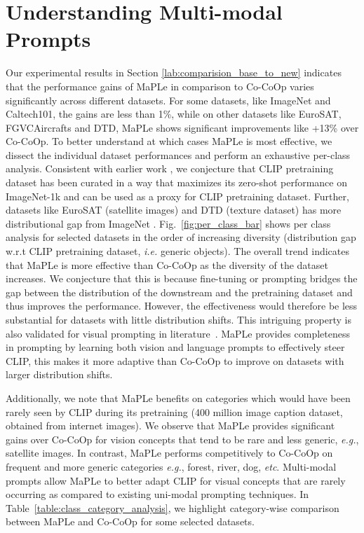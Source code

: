 \documentclass[10pt,twocolumn,letterpaper]{article}
\def\ie{\emph{i.e.}\xspace}
\def\eg{\emph{e.g.}\xspace}
\begin{document}
\section{Understanding Multi-modal Prompts}
\label{appendix:further_analysis}
\noindent Our experimental results in Section \ref{lab:comparision_base_to_new} indicates that the performance gains of MaPLe in comparison to Co-CoOp varies significantly across different datasets. For some datasets, like ImageNet and Caltech101, the gains are less than 1\%, while
on other datasets like EuroSAT, FGVCAircrafts and DTD, MaPLe shows significant improvements like +13\% over Co-CoOp. To better understand at which cases MaPLe is most effective, we dissect the individual dataset performances and perform an exhaustive per-class analysis. Consistent with earlier work \cite{bahng2022visual}, we conjecture that CLIP pretraining dataset has been curated in a way that maximizes its zero-shot performance on ImageNet-1k and can be used as a proxy for CLIP pretraining dataset. Further, datasets like EuroSAT (satellite images) and DTD (texture dataset) has more distributional gap from ImageNet \cite{bahng2022visual}. Fig.~\ref{fig:per_class_bar} shows per class analysis for selected datasets in the order of increasing diversity (distribution gap w.r.t CLIP pretraining dataset, \ie generic objects).
The overall trend indicates that MaPLe is more effective than Co-CoOp as the diversity of the dataset increases. We conjecture that this is because fine-tuning or prompting bridges the gap between the distribution of the downstream and the pretraining dataset and thus improves the performance. However, the effectiveness would therefore be  less substantial for datasets with little distribution shifts. This intriguing property is also validated for visual prompting in literature~\cite{bahng2022visual}. MaPLe provides completeness in prompting by learning both vision and language prompts to effectively steer CLIP, this makes it more adaptive than Co-CoOp to improve on datasets with larger distribution shifts.

 \noindent Additionally, we note that MaPLe benefits on categories which would have been rarely seen by CLIP during its pretraining (400 million image caption dataset, obtained from internet images). We observe that MaPLe provides significant gains over Co-CoOp for vision concepts that tend to be rare and less generic, \eg, satellite images. In contrast, MaPLe performs competitively to Co-CoOp on frequent and more generic categories \eg, forest, river, dog, \emph{etc}. Multi-modal prompts allow MaPLe to better adapt CLIP for visual concepts that are rarely occurring as compared to existing uni-modal prompting techniques. In Table~\ref{table:class_category_analysis}, we highlight category-wise comparison between MaPLe and Co-CoOp for some selected datasets.
\end{document}
